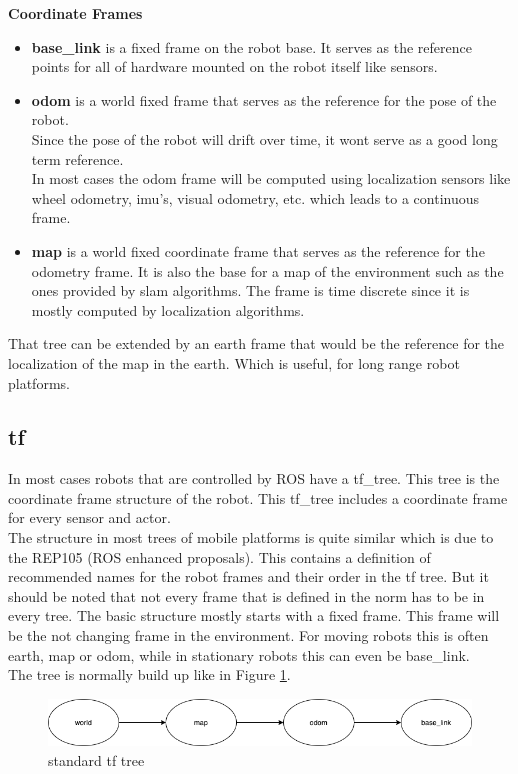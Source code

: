 	\textbf{Coordinate Frames}
	\begin{itemize}
		\item \textbf{base\_link} is a fixed frame on the robot base. It serves as the reference points for all of hardware mounted on the robot itself like sensors.
		\item \textbf{odom} is a world fixed frame that serves as the reference for the pose of the robot.\\ Since the pose of the robot will drift over time, it wont serve as a good long term reference.\\In most cases the odom frame will be computed using localization sensors like wheel odometry, imu's, visual odometry, etc. which leads to a continuous frame.
		\item \textbf{map} is a world fixed coordinate frame that serves as the reference for the odometry frame. It is also the base for a map of the environment such as the ones provided by slam algorithms. The frame is time discrete since it is mostly computed by localization algorithms.
	\end{itemize}
	
	That tree can be extended by an earth frame that would be the reference for the localization of the map in the earth. Which is useful, for long range robot platforms.\cite{REP105}
	
	
	
\subsection{tf}
In most cases robots that are controlled by ROS have a tf\_tree. This tree is the coordinate frame structure of the robot. This tf\_tree includes a coordinate frame for every sensor and actor.\\
 The structure in most trees of mobile platforms is quite similar which is due to the REP105 (ROS enhanced proposals). This contains a definition of recommended names for the robot frames and their order in the tf tree. But it should be noted that not every frame that is defined in the norm has to be in every tree. The basic structure mostly starts with a fixed frame. This frame will be the not changing frame in the environment. For moving robots this is often earth, map or odom, while in stationary robots this can even be base\_link.\\
 

The tree is normally build up like in Figure \ref{stdtftree}.


\begin{figure}[H]
	\includegraphics[width=\textwidth]{Pictures/tf standard tree}
	\caption{standard tf tree}
	\label{stdtftree}
\end{figure}

